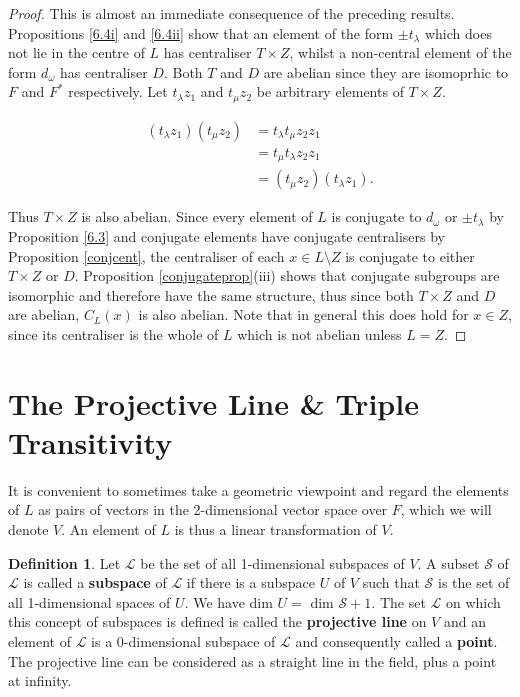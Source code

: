 \documentclass[a4paper , 11pt]{book}
\theoremstyle{definition}
\newtheorem*{definition-non}{Definition}
\theoremstyle{remark}
\begin{document}
\begin{proof} This is almost an immediate consequence of the preceding results. Propositions \ref{6.4i} and \ref{6.4ii} show that an element of the form $\pm t_\lambda$ which does not lie in the centre of $L$ has centraliser $T \times Z$, whilst a non-central element of the form $d_\omega$ has centraliser $D$. Both $T$ and $D$ are abelian since they are isomoprhic to $F$ and $F^*$ respectively. Let $t_\lambda z_1$ and $t_\mu z_2$  be arbitrary elements of $T \times Z$.

\vspace{-.5mm}
\begin{align*} (t_\lambda z_1)(t_\mu z_2)  &= t_\lambda t_\mu z_2 z_1  \tag{since  $z_1 \in Z$}
\\ &= t_\mu t_\lambda z_2 z_1  \tag{since  $T$ is abelian}
\\ &= (t_\mu z_2)(t_\lambda z_1).   \tag{since  $z_2 \in Z$}
\end {align*} 

Thus $T \times Z$ is also abelian. Since every element of $L$ is conjugate to $d_\omega$ or $\pm t_\lambda$ by Proposition \ref{6.3} and conjugate elements have conjugate centralisers by Proposition \ref{conjcent}, the centraliser of each $x \in L \setminus Z$ is conjugate to either $T \times Z$ or $D$. Proposition \ref{conjugateprop}(iii) shows that conjugate subgroups are isomorphic and therefore have the same structure, thus since both $T \times Z$ and $D$ are abelian, $C_L(x)$ is also abelian. Note that in general this does hold for $x \in Z$, since its centraliser is the whole of $L$ which is not abelian unless $L = Z$.

\end{proof}

\section{The Projective Line \& Triple Transitivity}

It is convenient to sometimes take a geometric viewpoint and regard the elements of $L$ as pairs of vectors in the 2-dimensional vector space over $F$, which we will denote $V$. An element of $L$ is thus a linear transformation of $V$. 

\begin{definition-non} Let $\mathscr{L}$ be the set of all 1-dimensional subspaces of $V$. A subset $\mathscr{S}$ of $\mathscr{L}$ is called a \textbf{subspace} of $\mathscr{L}$ if there is a subspace $U$ of $V$ such that $\mathscr{S}$ is the set of all 1-dimensional spaces of $U$. We have dim $U =$ dim $\mathscr{S} + 1$. The set $\mathscr{L}$ on which this concept of subspaces is defined is called the \textbf{projective line} on $V$ and an element of $\mathscr{L}$ is a 0-dimensional subspace of $\mathscr{L}$ and consequently called a \textbf{point}. The projective line can be considered as a straight line in the field, plus a point at infinity.
\end{definition-non}
\end{document}
